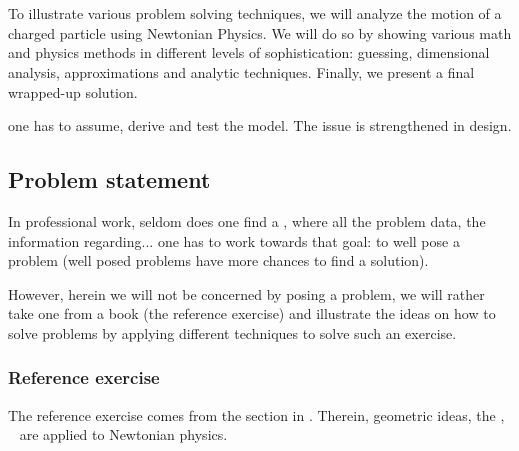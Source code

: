 \chapter{\docTitle}
%
%
To illustrate various problem solving techniques, we
%
%
will analyze the motion of a charged particle using Newtonian Physics. We will do so by showing various math and physics methods in different levels of sophistication: guessing, dimensional analysis, approximations and analytic techniques. Finally, we present a final wrapped-up solution.

one has to assume, derive and test the model. The issue is strengthened in design.


\section{Problem statement}
%
In professional work, seldom does one find a , where all the problem data, the information regarding...  one has to work towards that goal: to well pose a problem (well posed problems have more chances to find a solution).

However, herein we will not be concerned by posing a problem, we will rather take one from a book (the reference exercise) and illustrate the ideas on how to solve problems by applying different techniques to solve such an exercise.
%
%


\subsection{Reference exercise}\label{sec:referenceexercise}
%
The reference exercise comes from the  section in \cite[chap. 1, p. 8]{thorne:2011}. Therein, geometric ideas, \via the ,
%
~
%
are applied to Newtonian physics. 

